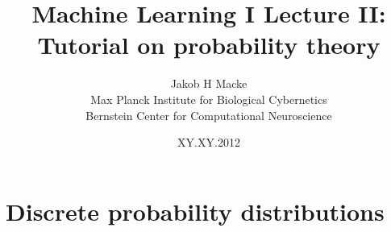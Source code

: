 \documentclass[10pt, handout]{beamer}
\begin{document}
\title{Machine Learning I Lecture II:\\ Tutorial on probability theory}   
\author{Jakob H Macke\\ Max Planck Institute for Biological Cybernetics\\ Bernstein Center for Computational Neuroscience} 
\date{XY.XY.2012} 

\frame{\titlepage} 





\section{Discrete probability distributions} 
\end{document}
